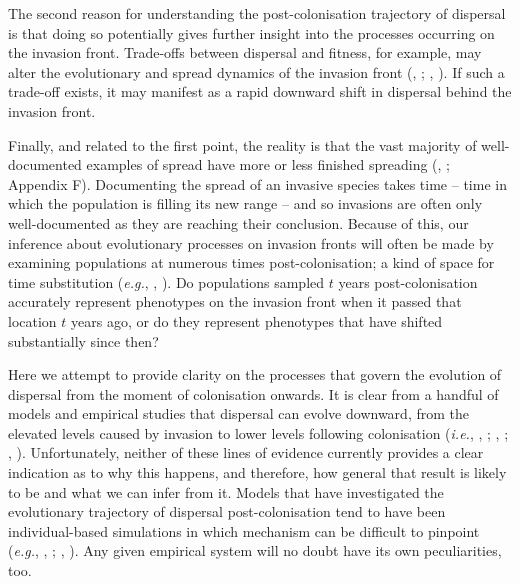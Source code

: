 \documentclass[11pt]{article}
\newcommand{\ie}{{\em i.e.}, }
\newcommand{\eg}{{\em e.g.}, }
\newcommand{\Cite}[1]{\citeauthor{#1}, \citeyear{#1}}
\begin{document}
The second reason for understanding the post-colonisation trajectory of dispersal is that doing so potentially gives further insight into the processes occurring on the invasion front. Trade-offs between dispersal and fitness, for example, may alter the evolutionary and spread dynamics of the invasion front (\Cite{Burton2010}; \Cite{Orlando2013}). If such a trade-off exists, it may manifest as a rapid downward shift in dispersal behind the invasion front.  

Finally, and related to the first point, the reality is that the vast majority of well-documented examples of spread have more or less finished spreading (\Cite{Perkins2012}; Appendix F). Documenting the spread of an invasive species takes time -- time in which the population is filling its new range -- and so invasions are often only well-documented as they are reaching their conclusion. Because of this, our inference about evolutionary processes on invasion fronts will often be made by examining populations at numerous times post-colonisation; a kind of space for time substitution (\eg \Cite{Phillips2008a}). Do populations sampled $t$ years post-colonisation accurately represent phenotypes on the invasion front when it passed that location $t$ years ago, or do they represent phenotypes that have shifted substantially since then?

Here we attempt to provide clarity on the processes that govern the evolution of dispersal from the moment of colonisation onwards. It is clear from a handful of models and empirical studies that dispersal can evolve downward, from the elevated levels caused by invasion to lower levels following colonisation (\ie \Cite{Duckworth2007}; \Cite{Burton2010}; \Cite{Lindstrom2013}). Unfortunately, neither of these lines of evidence currently provides a clear indication as to why this happens, and therefore, how general that result is likely to be and what we can infer from it. Models that have investigated the evolutionary trajectory of dispersal post-colonisation tend to have been individual-based simulations in which mechanism can be difficult to pinpoint (\eg \Cite{Burton2010}; \Cite{Travis2010}). Any given empirical system will no doubt have its own peculiarities, too.
\end{document}

